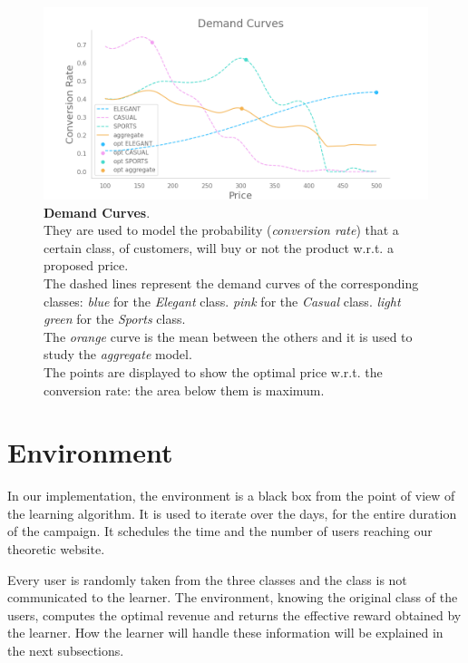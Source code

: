 \begin{figure}[H]
    \centering

    \includegraphics[width=1.0\textwidth]{images/demand_curves.png}
    \caption{\textbf{Demand Curves}.\\
    They are used to model the probability (\textit{conversion rate}) that a certain class, of customers, will buy or not the product w.r.t. a proposed price.\\
    The dashed lines represent the demand curves of the corresponding classes:
    \textit{blue} for the \textit{Elegant} class.
    \textit{pink} for the \textit{Casual} class.
    \textit{light green} for the \textit{Sports} class.\\
    The \textit{orange} curve is the mean between the others and it is used to study the \textit{aggregate} model.\\
    The points are displayed to show the optimal price w.r.t. the conversion rate: the area below them is maximum.}
    \label{demandCurvesFig}
\end{figure}


\section{Environment}

In our implementation, the environment is a black box from the point of view of the learning algorithm.
It is used to iterate over the days, for the entire duration of the campaign.
It schedules the time and the number of users reaching our theoretic website.

Every user is randomly taken from the three classes and the class is not communicated to the learner. The environment, knowing the original class of the users, computes the optimal revenue and returns the effective reward obtained by the learner.
How the learner will handle these information will be explained in the next subsections.



